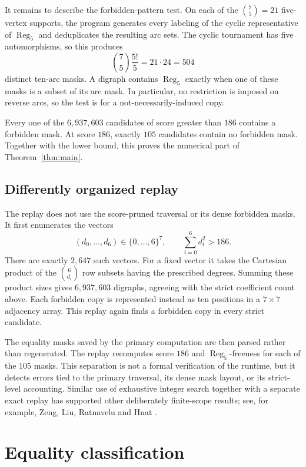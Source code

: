 \documentclass[11pt]{article}
\newcommand{\Reg}{\operatorname{Reg}_5}
\begin{document}
It remains to describe the forbidden-pattern test.  On each of the
$\binom75=21$ five-vertex supports, the program generates every labeling of
the cyclic representative of $\Reg$ and deduplicates the resulting arc sets.
The cyclic tournament has five automorphisms, so this produces
\[
 \binom75\frac{5!}{5}=21\cdot24=504
\]
distinct ten-arc masks.  A digraph contains $\Reg$ exactly when one of these
masks is a subset of its arc mask.  In particular, no restriction is imposed
on reverse arcs, so the test is for a not-necessarily-induced copy.

Every one of the $6{,}937{,}603$ candidates of score greater than $186$
contains a forbidden mask.  At score $186$, exactly $105$ candidates contain
no forbidden mask.  Together with the lower bound, this proves the numerical
part of Theorem~\ref{thm:main}.

\subsection{Differently organized replay}

The replay does not use the score-pruned traversal or its dense forbidden
masks.  It first enumerates the vectors
\[
 (d_0,\ldots,d_6)\in\{0,\ldots,6\}^7,
 \qquad \sum_{i=0}^6d_i^2>186.
\]
There are exactly $2{,}647$ such vectors.  For a fixed vector it takes the
Cartesian product of the $\binom6{d_i}$ row subsets having the prescribed
degrees.  Summing these product sizes gives $6{,}937{,}603$ digraphs, agreeing
with the strict coefficient count above.  Each forbidden copy is represented
instead as ten positions in a $7\times7$ adjacency array.  This replay again
finds a forbidden copy in every strict candidate.

The equality masks saved by the primary computation are then parsed rather
than regenerated.  The replay recomputes score $186$ and $\Reg$-freeness for
each of the $105$ masks.  This separation is not a formal verification of the
runtime, but it detects errors tied to the primary traversal, its dense mask
layout, or its strict-level accounting.  Similar use of exhaustive integer
search together with a separate exact replay has supported other deliberately
finite-scope results; see, for example, Zeng, Liu, Ratnavelu and Huat
\cite{ZengEtAl2026}.

\section{Equality classification}
\end{document}
